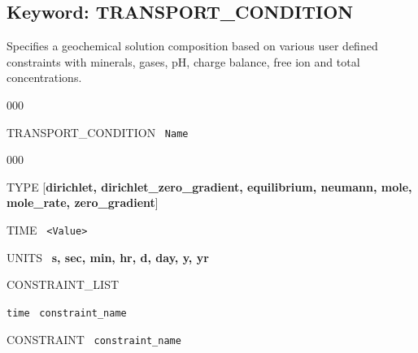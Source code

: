 \hyperlink{target_key}{\return}


\newpage
\protect\hypertarget{target_trans_cond}{}

\subsection{Keyword: TRANSPORT\_CONDITION}

\hfill\hyperlink{target_key}{\return}

 Specifies a geochemical solution composition based on various user defined constraints with minerals, gases, pH, charge balance, free ion and total concentrations.

\begin{deflist}{000}
\item[TRANSPORT\_CONDITION] \ {\tt Name}

\begin{deflist}{000}
\item[TYPE] [{\bf dirichlet, dirichlet\_zero\_gradient, equilibrium, neumann, mole, mole\_rate, \linebreak zero\_gradient}]
\item[TIME] \ {\tt <Value>}
\item[UNITS] \ {\bf s, sec, min, hr, d, day, y, yr}
\item[CONSTRAINT\_LIST]
\item {\tt time} \ {\tt constraint\_name}
\item[\keyend]
\item[CONSTRAINT] \ {\tt constraint\_name}
\end{deflist}
\item[\keyend]
\end{deflist}


